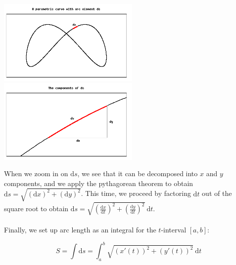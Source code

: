 \documentclass[10.5pt,twoside]{report}
\theoremstyle{definition}
\begin{document}
\includegraphics[width=2.7in]{figure_5_2_2_1} %
\includegraphics[width=2.7in]{figure_5_2_2_2} %

When we zoom in on $\mathrm{d}s$, we see that it can be decomposed into $x$ and $y$ components, and we apply the pythagorean theorem to obtain $ \mathrm{d}s= \sqrt{(\mathrm{d}x)^2+(\mathrm{d}y)^2}$. This time, we proceed by factoring $\mathrm{d}t$ out of the square root to obtain $\mathrm{d}s= \sqrt{\left( \frac{\mathrm{d}x}{\mathrm{d}t}\right)^2+\left( \frac{\mathrm{d}y}{\mathrm{d}t}\right) ^2}\ \mathrm{d}t$. \\
${}$\\

Finally, we set up arc length as an integral for the $t$-interval $[a,b]$:

\[S=\int \mathrm{d}s = \int_a^b \sqrt{(x'(t))^2+(y'(t))^2}\ \mathrm{d}t\]

${}$\\
\end{document}
